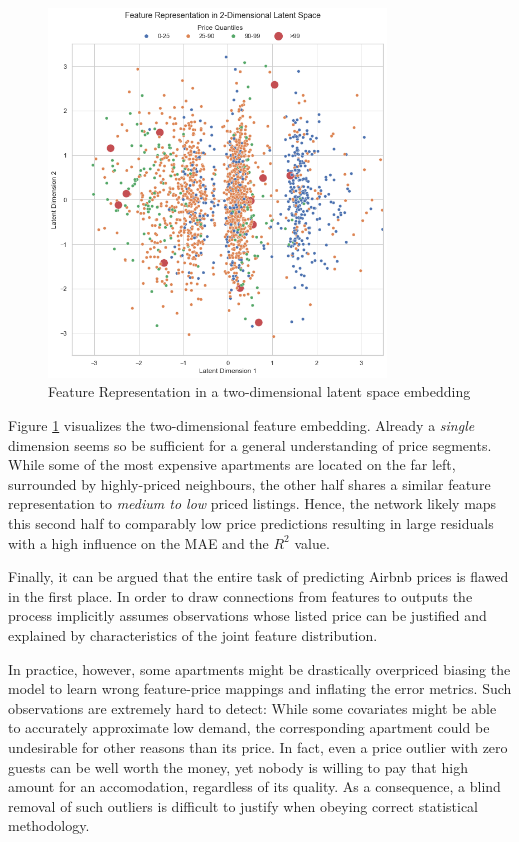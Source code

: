 \documentclass[12pt, letterpaper]{article}
\begin{document}
\begin{figure}[t]
    \centering
    \includegraphics[width=0.8\textwidth]{latent_representation.png}
    \caption{Feature Representation in a two-dimensional latent space embedding}
    \label{fig:latent-representation}
\end{figure}

Figure \ref{fig:latent-representation} visualizes the two-dimensional feature embedding.
Already a \emph{single} dimension seems so be sufficient for a general understanding of price segments.
While some of the most expensive apartments are located on the far left, surrounded by highly-priced neighbours, the other half shares a similar feature representation to \emph{medium to low} priced listings.
Hence, the network likely maps this second half to comparably low price predictions resulting in large residuals with a high influence on the MAE and the $R^2$ value.

Finally, it can be argued that the entire task of predicting Airbnb prices is flawed in the first place.
In order to draw connections from features to outputs the process implicitly assumes observations whose listed price can be justified and explained by characteristics of the joint feature distribution.

In practice, however, some apartments might be drastically overpriced biasing the model to learn wrong feature-price mappings and inflating the error metrics.
Such observations are extremely hard to detect:
While some covariates might be able to accurately approximate low demand, the corresponding apartment could be undesirable for other reasons than its price.
In fact, even a price outlier with zero guests can be well worth the money, yet nobody is willing to pay that high amount for an accomodation, regardless of its quality.
As a consequence, a blind removal of such outliers is difficult to justify when obeying correct statistical methodology.
\end{document}
